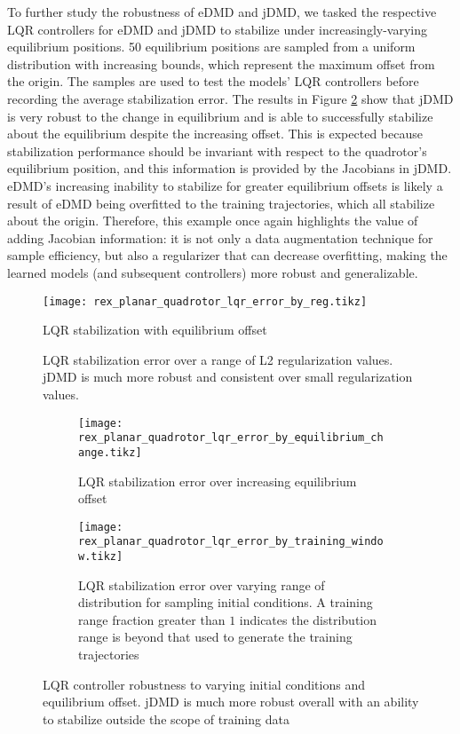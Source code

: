 \documentclass{article}
\begin{document}
To further study the robustness of eDMD and jDMD, we tasked the respective LQR controllers for eDMD and jDMD to stabilize under increasingly-varying equilibrium positions. 50 equilibrium positions are sampled from a uniform distribution with increasing bounds, which represent the maximum offset from the origin. The samples are used to test the models' LQR controllers before recording the average stabilization error. The results in Figure \ref{fig:rex_planar_quadrotor_lqr_error_by_equilibrium_change} show that jDMD is very robust to the change in equilibrium and is able to successfully stabilize about the equilibrium despite the increasing offset. This is expected because stabilization performance should be invariant with respect to the quadrotor's equilibrium position, and this information is provided by the Jacobians in jDMD. eDMD's increasing inability to stabilize for greater equilibrium offsets is likely a result of eDMD being overfitted to the training trajectories, which all stabilize about the origin. Therefore, this example once again highlights the value of adding Jacobian information: it is not only a data augmentation technique for sample efficiency, but also a regularizer that can decrease overfitting, making the learned models (and subsequent controllers) more robust and generalizable.

\begin{figure}
	\centering
	\texttt{[image: rex\_planar\_quadrotor\_lqr\_error\_by\_reg.tikz]}
	\caption{LQR stabilization with equilibrium offset}
	\label{fig:rex_planar_quadrotor_lqr_error_by_reg}
	\caption{ LQR stabilization error over a range of L2 regularization values. jDMD is much more robust and consistent over small regularization values.}
\end{figure}

\begin{figure}
	\centering
	\begin{subfigure}[t]{0.45\textwidth}
		\texttt{[image: rex\_planar\_quadrotor\_lqr\_error\_by\_equilibrium\_change.tikz]}
		\caption{LQR stabilization error over increasing equilibrium offset}
		\label{fig:rex_planar_quadrotor_lqr_error_by_equilibrium_change}
	\end{subfigure}
	\begin{subfigure}[t]{0.45\textwidth}
		\texttt{[image: rex\_planar\_quadrotor\_lqr\_error\_by\_training\_window.tikz]}
		\caption{LQR stabilization error over varying range of distribution for sampling initial conditions. A training range fraction greater than $1$ indicates the distribution range is beyond that used to generate the training trajectories}
		\label{fig:rex_planar_quadrotor_lqr_error_by_training_window}
	\end{subfigure}
	\caption{ LQR controller robustness to varying initial conditions and equilibrium offset. jDMD is much more robust overall with an ability to stabilize outside the scope of training data }
\end{figure}
\end{document}

